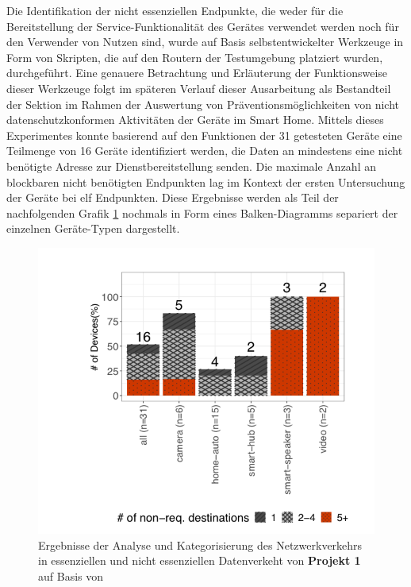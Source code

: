 \noindent Die Identifikation der nicht essenziellen Endpunkte, die weder für die Bereitstellung der Service-Funktionalität des Gerätes verwendet werden noch für den Verwender von Nutzen sind, wurde auf Basis selbstentwickelter Werkzeuge in Form von Skripten, die auf den Routern der Testumgebung platziert wurden, durchgeführt. 
Eine genauere Betrachtung und Erläuterung der Funktionsweise dieser Werkzeuge folgt im späteren Verlauf dieser Ausarbeitung als Bestandteil der Sektion  im Rahmen der Auswertung von Präventionsmöglichkeiten von nicht datenschutzkonformen Aktivitäten der Geräte im Smart Home.
Mittels dieses Experimentes konnte basierend auf den Funktionen der 31 getesteten Geräte eine Teilmenge von 16 Geräte identifiziert werden, die Daten an mindestens eine nicht benötigte Adresse zur Dienstbereitstellung senden. 
Die maximale Anzahl an blockbaren nicht benötigten Endpunkten lag im Kontext der ersten Untersuchung der Geräte bei elf Endpunkten. Diese Ergebnisse werden als Teil der nachfolgenden Grafik \ref{fig:result-non-req-dest} nochmals in Form eines Balken-Diagramms separiert der einzelnen Geräte-Typen dargestellt.

\begin{figure}
    \centering
    \includegraphics[scale=0.3]{main/pictures/projekt_one/Non_Required_Traffic}
    \caption{Ergebnisse der Analyse und Kategorisierung des Netzwerkverkehrs in essenziellen und nicht essenziellen Datenverkeht von \textbf{Projekt 1} auf Basis von \cite{Mandalari2021}}
    \label{fig:result-non-req-dest}
\end{figure}

